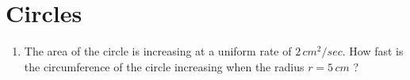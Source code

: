 \documentclass {article}                                   \usepackage[utf8]{inputenc}                                \usepackage {enumitem}                                     \usepackage {amsmath}
\begin{document}
\section {Circles}                                
\begin {enumerate}
\item The area of the circle is increasing at a uniform rate of $2\,cm^2/sec$. How fast is the circumference of the circle increasing when the radius $r = 5\,cm$ ?
\end {enumerate}
\end{document}
